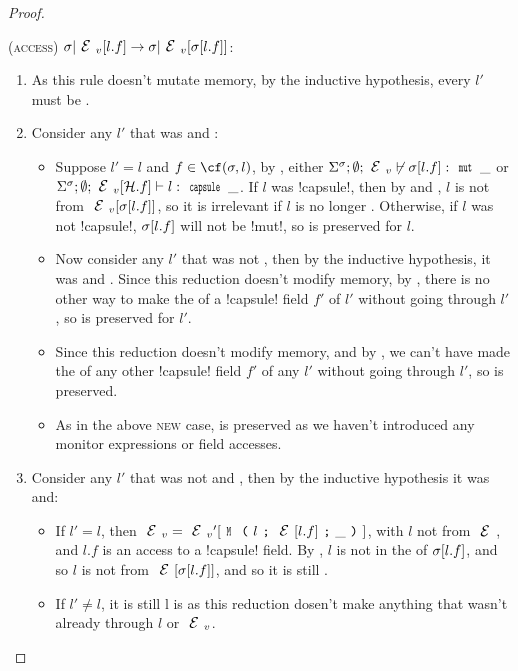 \begin{proof}
\begin{ienumerate}
\item (\textsc{access}) $\s|\EV[l.f]\rightarrow \s|\EV[\s[l.f]]$:
\begin{enumerate}
	\item As this rule doesn't mutate memory, by the inductive hypothesis, every $l'$ must be \CNC.
	\item Consider any $l'$ that was \WE and \NCM:
	\begin{itemize}
		\item Suppose $l' = l$ and $f \in \cf(\s, l)$, by , either $\Ss; \emptyset; \EV \nvdash \s[l.f] : \Kw{mut}\,\_$ or $\Ss; \emptyset; \EV[\h.f] \vdash l : \Kw{capsule}\,\_$. If $l$ was \Q!capsule!, then by  and \CNC, $l$ is not \reach from $\EV[\s[l.f]]$, so it is irrelevant if $l$ is no longer \WE. Otherwise, if $l$ was not \Q!capsule!, $\sigma[l.f]$ will not be \Q!mut!, so \WE is preserved for $l$.
		\item Now consider any $l'$ that was not \HNO, then by the inductive hypothesis, it was \WE and \NCM. Since this reduction doesn't modify memory, by , there is no other way to make the \rog of a \Q!capsule! field $f'$ of $l'$ \muty without going through $l'$, so \WE is preserved for $l'$.
		\item Since this reduction doesn't modify memory, and by , we can't have made the \rog of any other \Q!capsule! field $f'$ of any $l'$ \muty without going through $l'$, so \WE is preserved.
		\item As in the above \textsc{new} case, \NCM is preserved as we haven't introduced any monitor expressions or field accesses.
	\end{itemize}
	\item Consider any $l'$ that was not \WE and \NCM, then by the inductive hypothesis it was \HNO and:
	\begin{itemize}
		\item If $l' = l$, then $\EV = \EV'[\M{l}{\E[l.f]}{\_}]$, with $l$ not \reach from $\E$, and $l.f$ is an access to a \Q!capsule! field. By \CNC, $l$ is not in the \rog of $\sigma[l.f]$, and so $l$ is not \reach from $\E[\s[l.f]]$, and so it is still \HNO.
		\item If $l' \neq l$, it is still \HNO l is as this reduction dosen't make anything \reach that wasn't already \reach through $l$ or $\EV$.
	\end{itemize}
\end{enumerate}


\end{ienumerate}
\end{proof}

